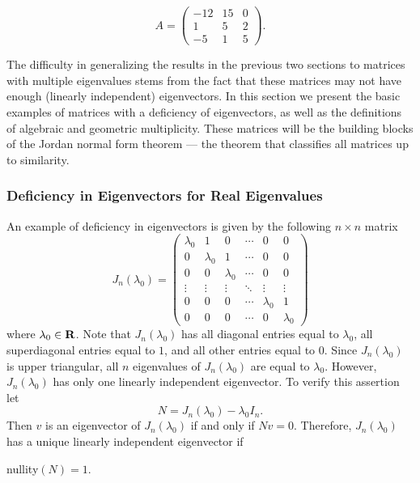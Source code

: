 \begin{exercise} \label{c10.4.7d}
\begin{equation*}
A = \left(\begin{array}{rrr}
   -12 &    15 &     0\\
     1 &     5 &     2\\
    -5 &     1 &     5
\end{array}\right).
\end{equation*}
\end{exercise}



  \label{S:MGE}

The difficulty in generalizing the results in the previous two sections to
matrices with multiple eigenvalues stems from the fact that these matrices 
may not have enough (linearly independent) eigenvectors.  In this section we 
present the basic examples of matrices with a deficiency of eigenvectors, as
well as the definitions of algebraic and geometric multiplicity.  These 
matrices will be the building blocks of the Jordan normal form theorem --- 
the theorem that classifies all matrices up to similarity.

\subsubsection*{Deficiency in Eigenvectors for Real Eigenvalues}

An example of deficiency in eigenvectors is given by the following 
$n\times n$ matrix
\begin{equation}  \label{E:JnR}
J_n(\lambda_0)=\left(\begin{array}{cccccc} \lambda_0 & 1 & 0 & \cdots & 0 & 0\\
	0 & \lambda_0 & 1 & \cdots & 0 & 0 \\
	0 & 0 & \lambda_0  & \cdots & 0 & 0\\
	\vdots & \vdots & \vdots & \ddots & \vdots & \vdots\\
	0 & 0 & 0 & \cdots & \lambda_0 & 1 \\
	0 & 0 & 0 & \cdots & 0 & \lambda_0 \end{array}\right)
\end{equation}
where $\lambda_0\in\mbox{$\bf{R}$}$.  Note that $J_n(\lambda_0)$ has all diagonal 
entries equal to $\lambda_0$,
all superdiagonal entries equal to $1$, and all other entries equal 
to $0$. Since $J_n(\lambda_0)$ is upper triangular, all $n$ 
eigenvalues of $J_n(\lambda_0)$ are equal to $\lambda_0$.  However,
$J_n(\lambda_0)$ has only one linearly independent eigenvector.  To 
verify this assertion let 
\[
N = J_n(\lambda_0) - \lambda_0I_n.
\]
Then $v$ is an eigenvector of $J_n(\lambda_0)$ if and only if $Nv=0$.
Therefore, $J_n(\lambda_0)$ has a unique linearly independent 
eigenvector  if 
\begin{lemma}
{\rm nullity}$(N)=1$.
\end{lemma}

